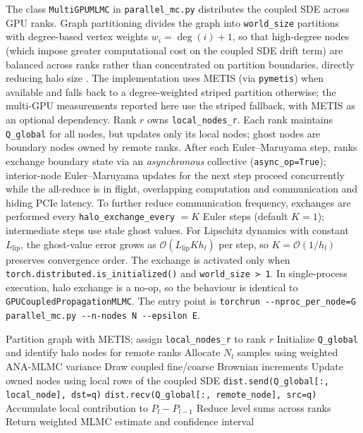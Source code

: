 \documentclass{ieeeaccess}
\begin{document}
The class \texttt{MultiGPUMLMC} in \texttt{parallel\_mc.py} distributes the coupled SDE
across GPU ranks. Graph partitioning divides the graph into \texttt{world\_size} partitions with
degree-based vertex weights $w_i = \deg(i)+1$, so that high-degree nodes (which impose greater
computational cost on the coupled SDE drift term) are balanced across ranks rather than
concentrated on partition boundaries, directly reducing halo size \cite{karypis1998multilevel}.
The implementation uses METIS (via \texttt{pymetis}) when available and falls back to a
degree-weighted striped partition otherwise; the multi-GPU measurements reported here use the
striped fallback, with METIS as an optional dependency.
Rank $r$ owns \texttt{local\_nodes\_r}. Each rank maintains \texttt{Q\_global} for all nodes, but
updates only its local nodes; ghost nodes are boundary nodes owned by remote ranks.
After each Euler--Maruyama step, ranks exchange boundary state via an
\emph{asynchronous} collective (\texttt{async\_op=True}); interior-node Euler--Maruyama updates for the
next step proceed concurrently while the all-reduce is in flight, overlapping computation
and communication and hiding PCIe latency.
To further reduce communication frequency, exchanges are performed every
\texttt{halo\_exchange\_every} $= K$ Euler steps (default $K{=}1$); intermediate steps use
stale ghost values. For Lipschitz dynamics with constant $L_{\mathrm{lip}}$, the
ghost-value error grows as $\mathcal{O}(L_{\mathrm{lip}} K h_l)$ per step, so
$K = \mathcal{O}(1/h_l)$ preserves convergence order.
The exchange is activated only when \texttt{torch.distributed.is\_initialized()} and
\texttt{world\_size > 1}. In single-process execution, halo exchange is a no-op, so the behaviour
is identical to \texttt{GPUCoupledPropagationMLMC}. The entry point is
{\small\texttt{torchrun -{}-nproc\_per\_node=G parallel\_mc.py -{}-n-nodes N -{}-epsilon E}}.

\begin{algorithm}[!t]
\caption{Multi-GPU ANA-MLMC Coupled SDE Loop.}
\label{alg:multi_gpu}
\begin{algorithmic}[1]
\STATE Partition graph with METIS; assign \texttt{local\_nodes\_r} to rank $r$
\STATE Initialize \texttt{Q\_global} and identify halo nodes for remote ranks
  \STATE Allocate $N_l$ samples using weighted ANA-MLMC variance
    \STATE Draw coupled fine/coarse Brownian increments
      \STATE Update owned nodes using local rows of the coupled SDE
          \STATE \texttt{dist.send(Q\_global[:, local\_node], dst=q)}
          \STATE \texttt{dist.recv(Q\_global[:, remote\_node], src=q)}
        \ENDFOR
      \ENDIF
    \ENDFOR
    \STATE Accumulate local contribution to $P_l-P_{l-1}$
  \ENDFOR
  \STATE Reduce level sums across ranks
\ENDFOR
\STATE Return weighted MLMC estimate and confidence interval
\end{algorithmic}
\end{algorithm}
\end{document}
